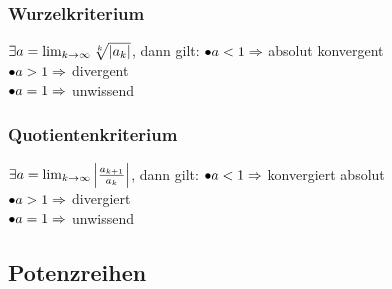 \subsubsection*{Wurzelkriterium}
$\exists a = \lim_{k \rightarrow \infty} \sqrt[k]{|a_k|}$, dann gilt:
     $\bullet a < 1 \Rightarrow$ absolut konvergent\\
     $\bullet a > 1 \Rightarrow$ divergent\\
     $\bullet a = 1 \Rightarrow$ unwissend
\subsubsection*{Quotientenkriterium}
$\exists a = \lim_{k \rightarrow \infty} \left| \frac{a_{k+1}}{a_k} \right|$, dann gilt:
    $\bullet a < 1 \Rightarrow$ konvergiert absolut\\
    $\bullet a > 1 \Rightarrow$ divergiert\\
    $\bullet a = 1 \Rightarrow $ unwissend 
\subsection*{Potenzreihen}
